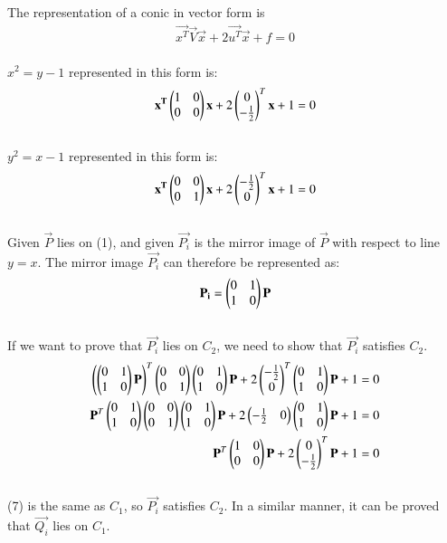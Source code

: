 \documentclass[12pt]{article}
\begin{document}
The representation of a conic in vector form is \begin{align}\vec{x^T}\vec{V}\vec{x} + 2\vec{u^T}\vec{x}+f = 0\end{align}\\
$x^2 = y- 1$ represented in this form is:
\begin{align}\mathbf{x^T}\begin{pmatrix}1&0\\0&0\end{pmatrix}\mathbf{x} + 2\begin{pmatrix}0 \\ -\frac{1}{2}\end{pmatrix}^T\mathbf{x}+1 = 0\end{align}\\
$y^2 = x- 1$ represented in this form is:
\begin{align}\mathbf{x^T}\begin{pmatrix}0&0\\0&1\end{pmatrix}\mathbf{x} + 2\begin{pmatrix}-\frac{1}{2}\\0\end{pmatrix}^T\mathbf{x}+1 = 0\end{align}\\
Given $\vec{P}$ lies on (1), and given $\vec{P_i}$ is the mirror image of $\vec{P}$ with respect to line $y=x$. The mirror image $\vec{P_i}$ can therefore be represented as:
\begin{align} \mathbf{P_i} = \begin{pmatrix}0&1\\1&0\end{pmatrix}\mathbf{P} \end{align}\\
If we want to prove that $\vec{P_i}$ lies on $C_2$, we need to show that $\vec{P_i}$ satisfies $C_2$.
\begin{align}
\left(\begin{pmatrix}0&1\\1&0\end{pmatrix}\mathbf{P}\right)^T\begin{pmatrix}0&0\\0&1\end{pmatrix}\begin{pmatrix}0&1\\1&0\end{pmatrix}\mathbf{P} + 2\begin{pmatrix}-\frac{1}{2}\\0\end{pmatrix}^T\begin{pmatrix}0&1\\1&0\end{pmatrix}\mathbf{P}+1 = 0\\
\mathbf{P}^T\begin{pmatrix}0&1\\1&0\end{pmatrix}\begin{pmatrix}0&0\\0&1\end{pmatrix}\begin{pmatrix}0&1\\1&0\end{pmatrix}\mathbf{P} + 2\begin{pmatrix}-\frac{1}{2}&0\end{pmatrix}\begin{pmatrix}0&1\\1&0\end{pmatrix}\mathbf{P}+1 = 0\\
\mathbf{P}^T\begin{pmatrix}1&0\\0&0\end{pmatrix}\mathbf{P} + 2\begin{pmatrix}0\\-\frac{1}{2}\end{pmatrix}^T\mathbf{P}+1 = 0
\end{align}\\
(7) is the same as $C_1$, so $\vec{P_i}$ satisfies $C_2$. In a similar manner, it can be proved that $\vec{Q_i}$ lies on $C_1$.\vspace{1cm}\\
\end{document}
